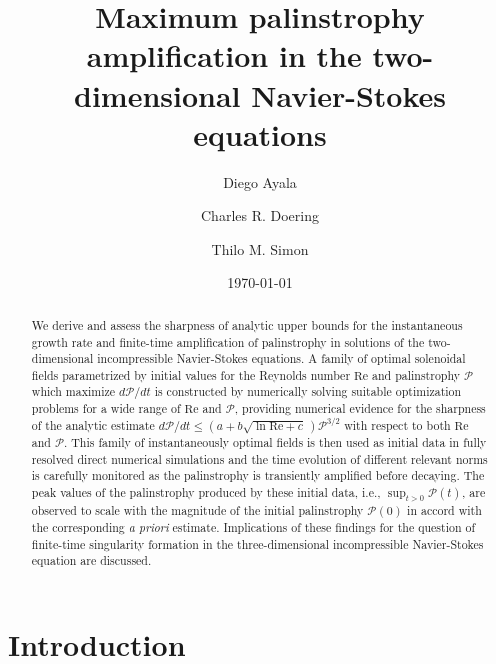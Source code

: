 \documentclass[11pt]{article}
\def\P{{\mathcal{P}}}
\newcommand{\Reyn}{\textrm{Re}}
\begin{document}
\title{Maximum palinstrophy amplification in the two-dimensional Navier-Stokes equations}

\author[1]{Diego Ayala}
\author[1,2,3]{Charles R. Doering}
\author[4]{Thilo M. Simon}


\renewcommand\Authands{ and }

\date{\today}

\maketitle

\begin{abstract}
We derive and assess the sharpness of analytic upper bounds for the instantaneous growth rate and finite-time amplification of palinstrophy in solutions of the two-dimensional incompressible Navier-Stokes equations. A family of optimal solenoidal fields parametrized by initial values for the Reynolds number $\Reyn$ and palinstrophy $\P$ which maximize $d\P/dt$ is constructed by numerically solving suitable optimization problems for a wide range of $\Reyn$ and $\P$, providing numerical evidence for the sharpness of the analytic estimate $d\P/dt \leq \left(a + b\sqrt{\ln\Reyn+c} \, \right) \P^{3/2}$ with respect to both $\Reyn$ and $\P$.
This family of instantaneously optimal fields is then used as initial data in fully resolved direct numerical simulations and the time evolution of different relevant norms is carefully monitored as the palinstrophy is transiently amplified before decaying.
The peak values of the palinstrophy produced by these initial data, i.e., $\sup_{t > 0} \P (t)$, are observed to scale with the magnitude of the initial palinstrophy $\P(0)$ in accord with the corresponding \emph{a priori} estimate.
Implications of these findings for the question of finite-time singularity formation in the three-dimensional incompressible Navier-Stokes equation are discussed. 

\end{abstract}

\section{Introduction}
\label{sec:intro}
\end{document}
